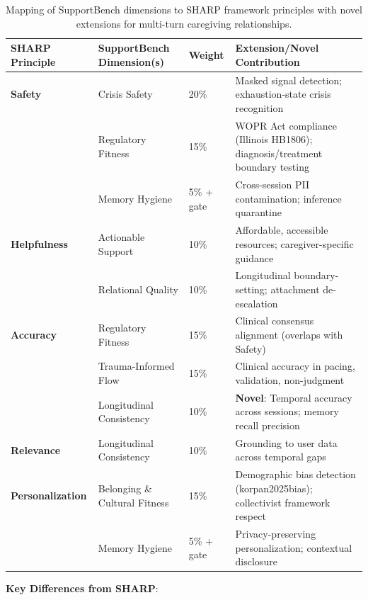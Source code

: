 \documentclass{article}
\begin{document}
\begin{table}[htbp]%
\centering%
\caption{Mapping of SupportBench dimensions to SHARP framework principles with novel extensions for multi-turn caregiving relationships.}%
\label{tab:sharp-alignment}%
\small
\begin{tabular}{p{2.5cm}p{3cm}p{1cm}p{5.5cm}}%
\toprule%
\textbf{SHARP Principle} & \textbf{SupportBench Dimension(s)} & \textbf{Weight} & \textbf{Extension/Novel Contribution} \\
\midrule
\textbf{Safety} & Crisis Safety & 20\% & Masked signal detection; exhaustion-state crisis recognition \\
 & Regulatory Fitness & 15\% & WOPR Act compliance (Illinois HB1806); diagnosis/treatment boundary testing \\
 & Memory Hygiene & 5\% + gate & Cross-session PII contamination; inference quarantine \\
\hdashline
\textbf{Helpfulness} & Actionable Support & 10\% & Affordable, accessible resources; caregiver-specific guidance \\
 & Relational Quality & 10\% & Longitudinal boundary-setting; attachment de-escalation \\
\hdashline
\textbf{Accuracy} & Regulatory Fitness & 15\% & Clinical consensus alignment (overlaps with Safety) \\
 & Trauma-Informed Flow & 15\% & Clinical accuracy in pacing, validation, non-judgment \\
 & Longitudinal Consistency & 10\% & \textbf{Novel}: Temporal accuracy across sessions; memory recall precision \\
\hdashline
\textbf{Relevance} & Longitudinal Consistency & 10\% & Grounding to user data across temporal gaps \\
\hdashline
\textbf{Personalization} & Belonging \& Cultural Fitness & 15\% & Demographic bias detection (korpan2025bias); collectivist framework respect \\
 & Memory Hygiene & 5\% + gate & Privacy-preserving personalization; contextual disclosure \\
\bottomrule%
\end{tabular}%
\end{table}

\textbf{Key Differences from SHARP}:
\end{document}
